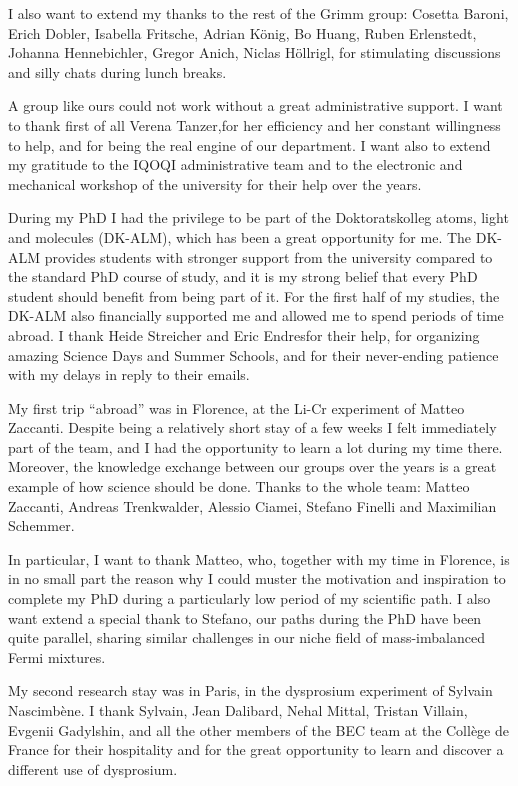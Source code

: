 I also want to extend my thanks to the rest of the Grimm group: Cosetta Baroni, Erich Dobler, Isabella Fritsche, Adrian K\"onig, Bo Huang, Ruben Erlenstedt, Johanna Hennebichler, Gregor Anich, Niclas H\"ollrigl, for stimulating discussions and silly chats during lunch breaks.

A group like ours could not work without a great administrative support. I want to thank first of all Verena Tanzer,for her efficiency and her constant willingness to help, and for being the real engine of our department. I want also to extend my gratitude to the IQOQI administrative team and to the electronic and mechanical workshop of the university for their help over the years.


During my PhD I had the privilege to be part of the Doktoratskolleg atoms, light and molecules (DK-ALM), which has been a great opportunity for me. The DK-ALM provides students with stronger support from the university compared to the standard PhD course of study, and it is my strong belief that every PhD student should benefit from being part of it. For the first half of my studies, the DK-ALM also financially supported me and allowed me to spend periods of time abroad. I thank Heide Streicher and Eric Endresfor their help, for organizing amazing Science Days and Summer Schools, and for their never-ending patience with my delays in reply to their emails.


 
My first trip ``abroad'' was in Florence, at the Li-Cr experiment of Matteo Zaccanti. Despite being a relatively short stay of a few weeks I felt immediately part of the team, and I had the opportunity to learn a lot during my time there. Moreover, the knowledge exchange between our groups over the years is a great example of how science should be done. Thanks to the whole team: Matteo Zaccanti, Andreas Trenkwalder, Alessio Ciamei, Stefano Finelli and Maximilian Schemmer. 

In particular, I want to thank Matteo, who, together with my time in Florence, is in no small part the reason why I could muster the motivation and inspiration to complete my PhD during a particularly low period of my scientific path.  I also want extend a special thank to Stefano, our paths during the PhD have been quite parallel, sharing similar challenges in our niche field of mass-imbalanced Fermi mixtures. 

My second research stay was in Paris, in the dysprosium experiment of Sylvain Nascimbène. I thank Sylvain, Jean Dalibard, Nehal Mittal, Tristan Villain, Evgenii Gadylshin, and all the other members of the BEC team at the Collège de France for their hospitality and for the great opportunity to learn and discover a different use of dysprosium.  


